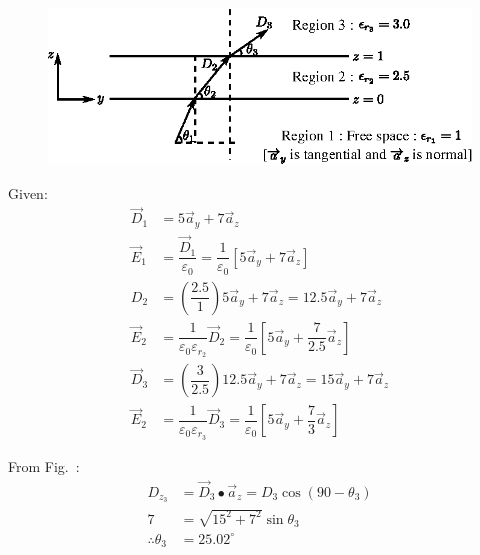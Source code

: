 \begin{solution}
~

\begin{figure}[H]
\centering
\includegraphics[scale=1.1]{images/fig6.eps}\label{chap27-fig6}
\end{figure}

Given:
\begin{align*}
\overrightarrow{D}_{1} & = 5\overrightarrow{a}_{y} + 7\overrightarrow{a}_{z}\\
\overrightarrow{E}_{1} & = \dfrac{\overrightarrow{D}_{1}}{\varepsilon_{0}} = \dfrac{1}{\varepsilon_{0}} [5\overrightarrow{a}_{y} + 7\overrightarrow{a}_{z}]\\
D_{2} & = \left(\dfrac{2.5}{1}\right) 5\overrightarrow{a}_{y} + 7\overrightarrow{a}_{z} = 12.5\overrightarrow{a}_{y} + 7\overrightarrow{a}_{z}\\
\overrightarrow{E}_{2} & = \dfrac{1}{\varepsilon_{0}\varepsilon_{r_{2}}} \overrightarrow{D}_{2} = \dfrac{1}{\varepsilon_{0}} \left[5\overrightarrow{a}_{y} + \dfrac{7}{2.5} \overrightarrow{a}_{z}\right]\\
\overrightarrow{D}_{3} & = \left(\dfrac{3}{2.5}\right) 12.5\overrightarrow{a}_{y} + 7\overrightarrow{a}_{z} = 15\overrightarrow{a}_{y} + 7\overrightarrow{a}_{z}\\
\overrightarrow{E}_{2} & = \dfrac{1}{\varepsilon_{0}\varepsilon_{r_{3}}} \overrightarrow{D}_{3} = \dfrac{1}{\varepsilon_{0}} \left[5\overrightarrow{a}_{y} + \dfrac{7}{3} \overrightarrow{a}_{z}\right]
\end{align*}

From Fig.~: 
\begin{align*}
D_{z_{3}} & = \overrightarrow{D}_{3} \bullet \overrightarrow{a}_{z} = D_{3} \cos (90 - \theta_{3})\\
7 & = \sqrt{15^{2} + 7^{2}} \sin \theta_{3}\\
\therefore \theta_{3} & = 25.02^{\circ}
\end{align*}
\end{solution}


